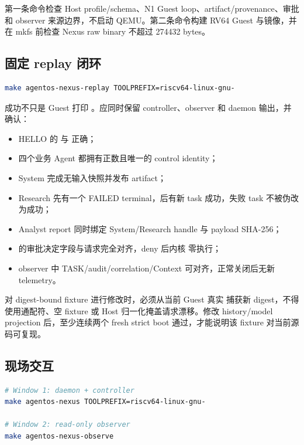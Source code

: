 第一条命令检查 Host profile/schema、N1 Guest loop、artifact/provenance、审批和 observer 来源边界，不启动 QEMU。第二条命令构建 RV64 Guest 与镜像，并在 mkfs 前检查 Nexus raw binary 不超过 274432 bytes。

\subsection{固定 replay 闭环}

\begin{lstlisting}[language=bash]
make agentos-nexus-replay TOOLPREFIX=riscv64-linux-gnu-
\end{lstlisting}

成功不只是 Guest 打印 。应同时保留 controller、observer 和 daemon 输出，并确认：

\begin{itemize}
  \item HELLO 的  与 正确；
  \item 四个业务 Agent 都拥有正数且唯一的 control identity；
  \item System 完成无输入快照并发布 artifact；
  \item Research 先有一个 FAILED terminal，后有新 task 成功，失败 task 不被伪改为成功；
  \item Analyst report 同时绑定 System/Research handle 与 payload SHA-256；
  \item {} 的审批决定字段与请求完全对齐，deny 后内核  零执行；
  \item observer 中 TASK/audit/correlation/Context 可对齐，正常关闭后无新 telemetry。
\end{itemize}

对 digest-bound fixture 进行修改时，必须从当前 Guest 真实  捕获新 digest，不得使用通配符、空 fixture 或 Host 归一化掩盖请求漂移。修改 history/model projection 后，至少连续两个 fresh strict boot 通过，才能说明该 fixture 对当前源码可复现。

\subsection{现场交互}

\begin{lstlisting}[language=bash]
# Window 1: daemon + controller
make agentos-nexus TOOLPREFIX=riscv64-linux-gnu-

# Window 2: read-only observer
make agentos-nexus-observe
\end{lstlisting}

